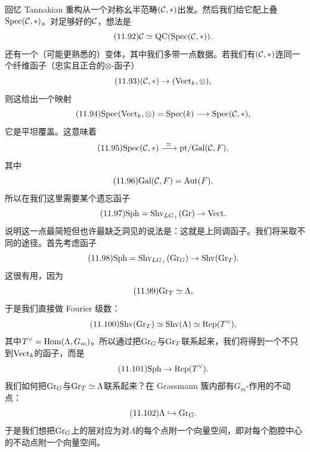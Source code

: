 回忆 Tannakian 重构从一个对称幺半范畴$(\mathcal{C},*)$出发。然后我们给它配上叠$\mathrm{Spec}(\mathcal{C},*)$。对足够好的$\mathcal{C}$，想法是
\begin{equation}\tag{11.92}
\mathcal{C}\simeq\mathrm{QC}(\mathrm{Spec}(\mathcal{C},*)).
\end{equation}
还有一个（可能更熟悉的）变体，其中我们多带一点数据。若我们有$(\mathcal{C},*)$连同一个纤维函子（忠实且正合的$\otimes$-函子）
\begin{equation}\tag{11.93}
(\mathcal{C},*)\to(\mathrm{Vect}_k,\otimes),
\end{equation}
则这给出一个映射
\begin{equation}\tag{11.94}
\mathrm{Spec}(\mathrm{Vect}_k,\otimes)=\mathrm{Spec}(k)\longrightarrow\mathrm{Spec}(\mathcal{C},*),
\end{equation}
它是平坦覆盖。这意味着
\begin{equation}\tag{11.95}
\mathrm{Spec}(\mathcal{C},*)\xrightarrow{\ \simeq\ }\mathrm{pt}/\mathrm{Gal}(\mathcal{C},F),
\end{equation}
其中
\begin{equation}\tag{11.96}
\mathrm{Gal}(\mathcal{C},F)=\mathrm{Aut}(F).
\end{equation}
所以在我们这里需要某个遗忘函子
\begin{equation}\tag{11.97}
\mathrm{Sph}=\mathrm{Shv}_{LG_+}(\mathrm{Gr})\to\mathrm{Vect}.
\end{equation}
说明这一点最简短但也许最缺乏洞见的说法是：这就是上同调函子。我们将采取不同的途径。首先考虑函子
\begin{equation}\tag{11.98}
\mathrm{Sph}=\mathrm{Shv}_{LG_+}(\mathrm{Gr}_G)\to\mathrm{Shv}(\mathrm{Gr}_T).
\end{equation}
这很有用，因为
\begin{equation}\tag{11.99}
\mathrm{Gr}_T\simeq\Lambda,
\end{equation}
于是我们直接做 Fourier 级数：
\begin{equation}\tag{11.100}
\mathrm{Shv}(\mathrm{Gr}_T)\simeq\mathrm{Shv}(\Lambda)\simeq\mathrm{Rep}(T^{\vee}),
\end{equation}
其中$T^{\vee}=\mathrm{Hom}(\Lambda,G_m)$。所以通过把$\mathrm{Gr}_G$与$\mathrm{Gr}_T$联系起来，我们将得到一个不只到$\mathrm{Vect}_k$的函子，而是
\begin{equation}\tag{11.101}
\mathrm{Sph}\to\mathrm{Rep}(T^{\vee}).
\end{equation}
我们如何把$\mathrm{Gr}_G$与$\mathrm{Gr}_T\simeq\Lambda$联系起来？在 Grassmann 簇内部有$G_m$-作用的不动点：
\begin{equation}\tag{11.102}
\Lambda\hookrightarrow\mathrm{Gr}_G.
\end{equation}
于是我们想把$\mathrm{Gr}_G$上的层对应为对$\Lambda$的每个点附一个向量空间，即对每个胞腔中心的不动点附一个向量空间。

